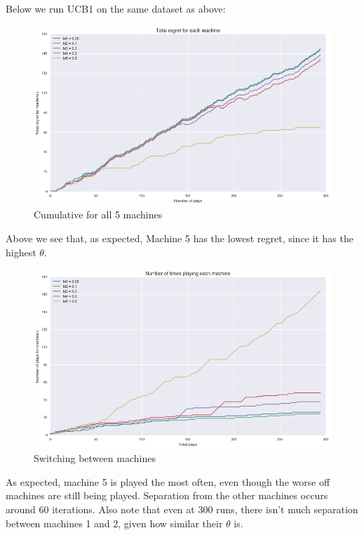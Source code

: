 \documentclass{article}
\begin{document}
Below we run UCB1 on the same dataset as above:

\begin{figure}[H]
\centering
\includegraphics[scale=0.4]{UCB_regret.png}
\caption{Cumulative for all 5 machines}
\end{figure}

Above we see that, as expected, Machine 5 has the lowest regret, since it has the highest $\theta$. 

\begin{figure}[H]
\centering
\includegraphics[scale=0.4]{UCB_num_plays.png}
\caption{Switching between machines}
\end{figure}

As expected, machine 5 is played the most often, even though the worse off machines are still being played. Separation from the other machines occurs around 60 iterations. Also note that even at 300 runs, there isn't much separation between machines 1 and 2, given how similar their $\theta$ is.
\end{document}
